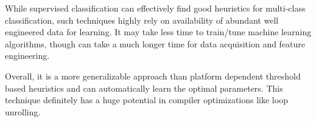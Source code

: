 \documentclass[]{sig-alternate}
\begin{document}
While supervised classification can effectively find good heuristics for multi-class classification, such techniques highly rely on availability of abundant well engineered data for learning. It may take less time to train/tune machine learning algorithms, though can take a much longer time for data acquisition and feature engineering.

Overall, it is a more generalizable approach than platform dependent threshold based heuristics and can automatically learn the optimal parameters. This technique definitely has a huge potential in compiler optimizations like loop unrolling.


\begin{scriptsize}
  
\end{scriptsize}
\end{document}

